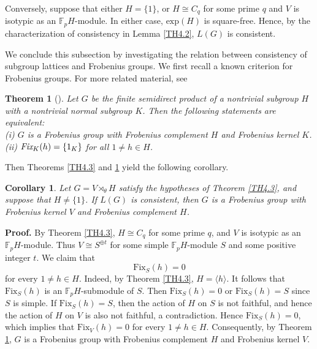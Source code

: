 \documentclass[12pt]{article}
\newtheorem{theorem}{\bf Theorem}[section]
\newtheorem{corollary}{\bf Corollary}[section]
\def\QEDopen{{\setlength{\fboxsep}{0pt}\setlength{\fboxrule}{0.2pt}\fbox{\rule[0pt]{0pt}{1.3ex}\rule[0pt]{1.3ex}{0pt}}}}
\def\QED{\QEDopen}
\def\proof{{\bf Proof.} }
\def\endproof{\hspace*{\fill}~\QED\par\endtrivlist\unskip}
\begin{document}
Conversely, suppose that either $H=\{1\}$, or $H\cong C_q$ for some prime $q$ and $V$ is isotypic as an $\mathbb{F}_pH$-module. In either case, $\mbox{exp}(H)$ is square-free. 
Hence, by the characterization of consistency in Lemma \ref{TH4.2}, $L(G)$ is consistent.
\endproof

We conclude this subsection by investigating the relation between consistency 
of subgroup lattices and Frobenius groups. We first recall a known criterion for Frobenius groups. 
For more related material, see \cite{KKK, Scott}

\begin{theorem}[\cite{KKK}]\label{Frob}
Let $G$ be the finite semidirect product of a nontrivial subgroup $H$ with
a nontrivial normal subgroup $K$. Then the following statements are equivalent:\\
(i) $G$ is a Frobenius group with Frobenius complement $H$ and Frobenius
kernel $K$.\\
(ii) $\emph{Fix}_K(h)=\{1_K\}$ for all $1\neq h\in H$.
\end{theorem}

Then Theorems \ref{TH4.3} and \ref{Frob} yield the following corollary.
\begin{corollary}\label{corr4.2}
Let $G=V\rtimes_\theta H$ satisfy the hypotheses of Theorem \ref{TH4.3}, and suppose that $H\neq\{1\}$.
If $L(G)$ is consistent, then $G$ is a Frobenius group with Frobenius kernel $V$ and Frobenius complement $H$.
\end{corollary}
\proof
By Theorem \ref{TH4.3}, $H\cong C_q$ for some prime $q$, and $V$ is isotypic as an $\mathbb{F}_pH$-module. Thus $V\cong S^{\oplus t}$ for 
some simple $\mathbb{F}_pH$-module $S$ and some positive integer $t$. We claim that $$\mbox{Fix}_S(h)=0$$ for every $1\neq h\in H$. 
Indeed, by Theorem \ref{TH4.3}, $H=\langle h\rangle$. It follows that $\mbox{Fix}_S(h)$ is an $\mathbb{F}_pH$-submodule of $S$. Then $\mbox{Fix}_S(h)=0$ or $\mbox{Fix}_S(h)=S$ since $S$ is simple. If $\mbox{Fix}_S(h)=S$, then the action of $H$ on $S$ is not faithful, 
and hence the action of $H$ on $V$ is also not faithful, a contradiction. Hence $\mbox{Fix}_S(h)=0$, which implies that 
$\mbox{Fix}_V(h)=0$ for every $1\neq h\in H$. 
Consequently, by Theorem \ref{Frob}, $G$ is a Frobenius group with Frobenius complement $H$ and Frobenius kernel $V$.
\endproof
\end{document}
